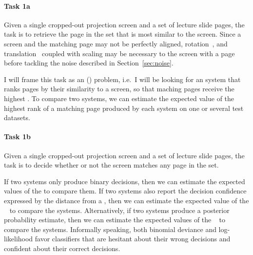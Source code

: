 \paragraph{Task 1a} Given a single cropped-out projection screen and a set of
lecture slide pages, the task is to retrieve the page in the set that is most
similar to the screen. Since a screen and the matching page may not be
perfectly aligned, rotation~\cite{smith1995simple}, and
translation~\cite{sarvaiyaetal09} coupled with scaling may be necessary to
 the screen with a page before tackling the noise described in
Section~\ref{sec:noise}.

I will frame this task as an  () problem,
i.e.\ I will be looking for an  system that ranks pages by their
similarity to a screen, so that maching pages receive the highest .
To compare two systems, we can estimate the expected value of the highest
rank of a matching page produced by each system on one or several test
datasets.

\paragraph{Task 1b} Given a single cropped-out projection screen and a set of
lecture slide pages, the task is to decide whether or not the screen matches
any page in the set.

If two systems only produce binary decisions, then we can estimate the expected
values of the  to compare them. If two systems
also report the decision confidence expressed by the distance from a
, then we can estimate the expected value of the
~\cite[sec.~10.6]{friedman2001elements} to compare the
systems. Alternatively, if two systems produce a posterior probability
estimate, then we can estimate the expected values of the
~\cite[sec.~2.6.3]{friedman2001elements} to compare the
systems.
Informally speaking, both binomial deviance and log-likelihood favor
classifiers that are hesitant about their wrong decisions and confident about
their correct decisions.

